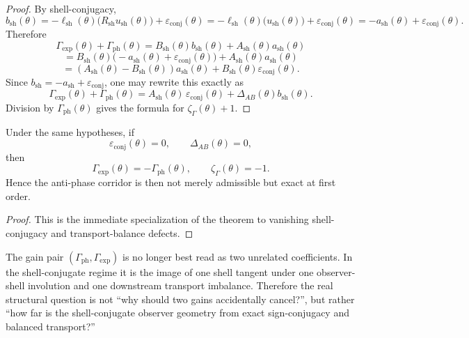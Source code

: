\begin{proof}
By shell-conjugacy,
\[
  b_{\mathrm{sh}}(\theta)
  =-\ell_{\mathrm{sh}}(\theta)\bigl(R_{\mathrm{sh}}u_{\mathrm{sh}}(\theta)\bigr)+\varepsilon_{\mathrm{conj}}(\theta)
  =-\ell_{\mathrm{sh}}(\theta)\bigl(u_{\mathrm{sh}}(\theta)\bigr)+\varepsilon_{\mathrm{conj}}(\theta)
  =-a_{\mathrm{sh}}(\theta)+\varepsilon_{\mathrm{conj}}(\theta).
\]
Therefore
\[
  \Gamma_{\mathrm{exp}}(\theta)+\Gamma_{\mathrm{ph}}(\theta)
  =B_{\mathrm{sh}}(\theta)b_{\mathrm{sh}}(\theta)+A_{\mathrm{sh}}(\theta)a_{\mathrm{sh}}(\theta)
\]
\[
  =B_{\mathrm{sh}}(\theta)\bigl(-a_{\mathrm{sh}}(\theta)+\varepsilon_{\mathrm{conj}}(\theta)\bigr)+A_{\mathrm{sh}}(\theta)a_{\mathrm{sh}}(\theta)
\]
\[
  =(A_{\mathrm{sh}}(\theta)-B_{\mathrm{sh}}(\theta))a_{\mathrm{sh}}(\theta)+B_{\mathrm{sh}}(\theta)\varepsilon_{\mathrm{conj}}(\theta).
\]
Since $b_{\mathrm{sh}}=-a_{\mathrm{sh}}+\varepsilon_{\mathrm{conj}}$, one may rewrite this exactly as
\[
  \Gamma_{\mathrm{exp}}(\theta)+\Gamma_{\mathrm{ph}}(\theta)
  =A_{\mathrm{sh}}(\theta)\,\varepsilon_{\mathrm{conj}}(\theta)+\Delta_{AB}(\theta)b_{\mathrm{sh}}(\theta).
\]
Division by $\Gamma_{\mathrm{ph}}(\theta)$ gives the formula for $\zeta_{\Gamma}(\theta)+1$.
\end{proof}

\begin{corollary}
Under the same hypotheses, if
\[
  \varepsilon_{\mathrm{conj}}(\theta)=0,
  \qquad
  \Delta_{AB}(\theta)=0,
\]
then
\[
  \Gamma_{\mathrm{exp}}(\theta)=-\Gamma_{\mathrm{ph}}(\theta),
  \qquad
  \zeta_{\Gamma}(\theta)=-1.
\]
Hence the anti-phase corridor is then not merely admissible but exact at first order.
\end{corollary}

\begin{proof}
This is the immediate specialization of the theorem to vanishing shell-conjugacy and transport-balance defects.
\end{proof}

\begin{remark}
The gain pair $(\Gamma_{\mathrm{ph}},\Gamma_{\mathrm{exp}})$ is no longer best read as two unrelated coefficients. In the shell-conjugate regime it is the image of one shell tangent under one observer-shell involution and one downstream transport imbalance. Therefore the real structural question is not ``why should two gains accidentally cancel?'', but rather ``how far is the shell-conjugate observer geometry from exact sign-conjugacy and balanced transport?''
\end{remark}


